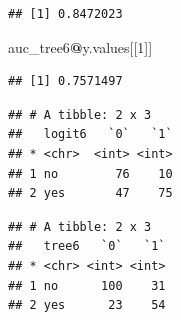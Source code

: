 \documentclass[]{article}
\newenvironment{Shaded}{\begin{snugshade}}{\end{snugshade}}
\newcommand{\KeywordTok}[1]{\textcolor[rgb]{0.13,0.29,0.53}{\textbf{#1}}}
\newcommand{\DataTypeTok}[1]{\textcolor[rgb]{0.13,0.29,0.53}{#1}}
\newcommand{\DecValTok}[1]{\textcolor[rgb]{0.00,0.00,0.81}{#1}}
\newcommand{\FloatTok}[1]{\textcolor[rgb]{0.00,0.00,0.81}{#1}}
\newcommand{\StringTok}[1]{\textcolor[rgb]{0.31,0.60,0.02}{#1}}
\newcommand{\OperatorTok}[1]{\textcolor[rgb]{0.81,0.36,0.00}{\textbf{#1}}}
\newcommand{\NormalTok}[1]{#1}
\begin{document}
\begin{verbatim}
## [1] 0.8472023
\end{verbatim}

\begin{Shaded}
\begin{Highlighting}[]
\NormalTok{auc_tree6}\OperatorTok{@}\NormalTok{y.values[[}\DecValTok{1}\NormalTok{]]}
\end{Highlighting}
\end{Shaded}

\begin{verbatim}
## [1] 0.7571497
\end{verbatim}

\begin{Shaded}
\end{Shaded}

\begin{verbatim}
## # A tibble: 2 x 3
##   logit6   `0`   `1`
## * <chr>  <int> <int>
## 1 no        76    10
## 2 yes       47    75
\end{verbatim}

\begin{Shaded}
\end{Shaded}

\begin{verbatim}
## # A tibble: 2 x 3
##   tree6   `0`   `1`
## * <chr> <int> <int>
## 1 no      100    31
## 2 yes      23    54
\end{verbatim}
\end{document}
